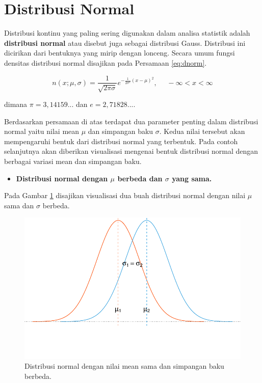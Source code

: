 \documentclass[]{book}
\providecommand{\tightlist}{%
  \setlength{\itemsep}{0pt}\setlength{\parskip}{0pt}}
\begin{document}
\section{Distribusi Normal}\label{distribusi-normal}

Distribusi kontinu yang paling sering digunakan dalam analisa statistik
adalah \textbf{distribusi normal} atau disebut juga sebagai distribusi
Gauss. Distribusi ini dicirikan dari bentuknya yang mirip dengan
lonceng. Secara umum fungsi densitas distribusi normal disajikan pada
Persamaan \eqref{eq:dnorm}.

\begin{equation}
   n\left(x;\mu,\sigma\right)=\frac{1}{\sqrt{2\pi\sigma}}e^{-\frac{1}{2\sigma^2}\left(x-\mu\right)^2},\ \ \ \ \ \ -\infty<x<\infty
  \label{eq:dnorm}
\end{equation}

dimana \(\pi=3,14159...\) dan \(e=2,71828...\).

Berdasarkan persamaan di atas terdapat dua parameter penting dalam
distribusi normal yaitu nilai mean \(\mu\) dan simpangan baku
\(\sigma\). Kedua nilai tersebut akan mempengaruhi bentuk dari
distribusi normal yang terbentuk. Pada contoh selanjutnya akan diberikan
visualisasi mengenai bentuk distribusi normal dengan berbagai variasi
mean dan simpangan baku.

\begin{itemize}
\tightlist
\item
  \textbf{Distribusi normal dengan \(\mu\) berbeda dan \(\sigma\) yang
  sama.}
\end{itemize}

Pada Gambar \ref{fig:normvis} disajikan visualisasi dua buah distribusi
normal dengan nilai \(\mu\) sama dan \(\sigma\) berbeda.

\begin{figure}

{\centering \includegraphics[width=0.7\linewidth]{EnvStat_files/figure-latex/normvis-1} 

}

\caption{Distribusi normal dengan nilai mean sama dan simpangan baku berbeda.}\label{fig:normvis}
\end{figure}
\end{document}

